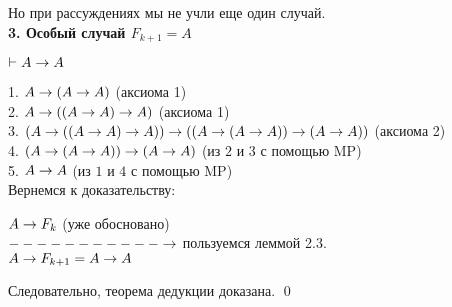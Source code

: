 Но при рассуждениях мы не учли еще один случай.\\
 \textbf{3. Особый случай $F_{k+1} = A$}\\
 \begin{lemma}
 $\vdash A \rightarrow A$
 \end{lemma}
 \conclude
 \hspace*{18mm} 1. $A \rightarrow (A\rightarrow A)$ (аксиома 1) \\
\hspace*{35mm} 2. $A \rightarrow ((A\rightarrow A) \rightarrow A)$ (аксиома 1)\\
\hspace*{35mm} 3. $(A \rightarrow ((A\rightarrow A) \rightarrow A))\rightarrow ((A \rightarrow (A\rightarrow A))\rightarrow (A\rightarrow A))$ (аксиома 2) \\
\hspace*{35mm} 4. $(A\rightarrow (A\rightarrow A))\rightarrow (A\rightarrow A)$ (из $2$ и $3$ с помощью MP)\\
\hspace*{35mm} 5. $A\rightarrow A$ (из $1$ и $4$ с помощью MP)\\
Вернемся к доказательству:
\begin{center}
    $A\rightarrow F_k$ (уже обосновано)\\
    \hspace{40mm} $-----------\rightarrow$ пользуемся леммой 2.3.\\
    $A\rightarrow F_{k+1} = A\rightarrow A$
\end{center}
Следовательно, теорема дедукции доказана.
\qed
